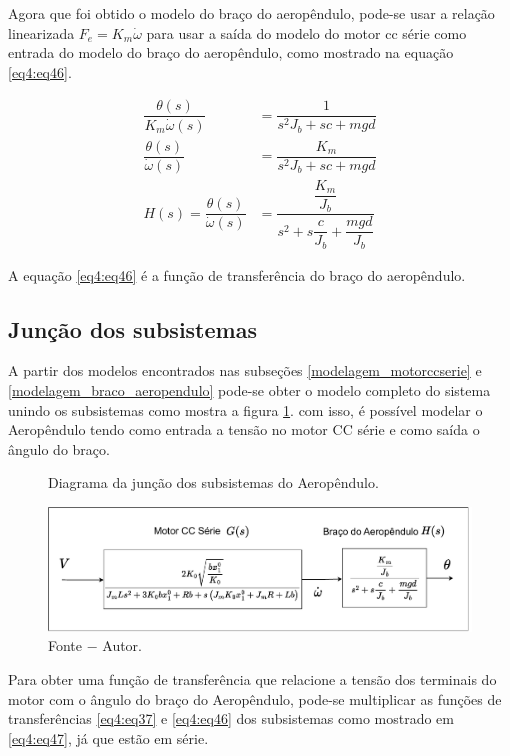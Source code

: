 Agora que foi obtido o modelo do braço do aeropêndulo, pode-se usar a relação linearizada $F_e = K_m\dot{\omega}$ para usar a saída do modelo do motor cc série como entrada do modelo do braço do aeropêndulo, como mostrado na equação \ref{eq4:eq46}.

\begin{align}
    \dfrac{\theta(s)}{K_m\dot{\omega}(s)} &= \dfrac{1}{s^2J_b + sc +mgd} \label{eq4:eq44}\\
    \dfrac{\theta(s)}{\dot{\omega}(s)} &= \dfrac{K_m}{s^2J_b + sc +mgd} \label{eq4:eq45}\\
    H(s) = \dfrac{\theta(s)}{\dot{\omega}(s)} &= \dfrac{\dfrac{K_m}{J_b}}{s^2 + s\dfrac{c}{J_b} +\dfrac{mgd}{J_b}} \label{eq4:eq46}
\end{align}


A equação  \ref{eq4:eq46} é a função de transferência do braço do aeropêndulo.

\subsection{Junção dos subsistemas}
\label{junca0_submodelos}

A partir dos modelos encontrados nas subseções \ref{modelagem_motorccserie} e \ref{modelagem_braco_aeropendulo} pode-se obter o modelo completo do sistema unindo os subsistemas como mostra a figura \ref{fig4:image_05}. com isso, é possível modelar o Aeropêndulo tendo como entrada a tensão no motor CC série e como saída o ângulo do braço.

\begin{figure}[!h]
	\centering
	\caption{Diagrama da junção dos subsistemas do  Aeropêndulo.}
            \includegraphics[width=1\textwidth, page=1]{Capitulos/4_desenvolvimento/4_figuras/ft_subsistemas.pdf}
	\caption*{Fonte $-$ Autor.}
        \label{fig4:image_05}
\end{figure}


Para obter uma função de transferência que relacione a tensão dos terminais do motor com o ângulo do braço do Aeropêndulo, pode-se multiplicar as funções de transferências \ref{eq4:eq37} e \ref{eq4:eq46} dos subsistemas como mostrado em \ref{eq4:eq47}, já que estão em série.

